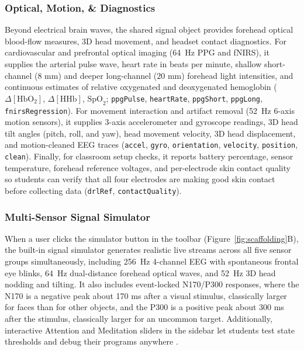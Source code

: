 \documentclass[11pt]{article}
\begin{document}
\subsubsection{Optical, Motion, \& Diagnostics}
Beyond electrical brain waves, the shared signal object provides forehead optical blood-flow measures, 3D head movement, and headset contact diagnostics. For cardiovascular and prefrontal optical imaging (64~Hz PPG and fNIRS), it supplies the arterial pulse wave, heart rate in beats per minute, shallow short-channel ($8\text{ mm}$) and deeper long-channel ($20\text{ mm}$) forehead light intensities, and continuous estimates of relative oxygenated and deoxygenated hemoglobin ($\Delta[\text{HbO}_2]$, $\Delta[\text{HHb}]$, $\text{SpO}_2$; \texttt{ppgPulse}, \texttt{heartRate}, \texttt{ppgShort}, \texttt{ppgLong}, \texttt{fnirsRegression}). For movement interaction and artifact removal (52~Hz 6-axis motion sensors), it supplies 3-axis accelerometer and gyroscope readings, 3D head tilt angles (pitch, roll, and yaw), head movement velocity, 3D head displacement, and motion-cleaned EEG traces (\texttt{accel}, \texttt{gyro}, \texttt{orientation}, \texttt{velocity}, \texttt{position}, \texttt{clean}). Finally, for classroom setup checks, it reports battery percentage, sensor temperature, forehead reference voltages, and per-electrode skin contact quality so students can verify that all four electrodes are making good skin contact before collecting data (\texttt{drlRef}, \texttt{contactQuality}).

\subsubsection{Multi-Sensor Signal Simulator}
When a user clicks the simulator button in the toolbar (Figure~\ref{fig:scaffolding}B), the built-in signal simulator generates realistic live streams across all five sensor groups simultaneously, including 256~Hz 4-channel EEG with spontaneous frontal eye blinks, 64~Hz dual-distance forehead optical waves, and 52~Hz 3D head nodding and tilting. It also includes event-locked N170/P300 responses, where the N170 is a negative peak about 170 ms after a visual stimulus, classically larger for faces than for other objects, and the P300 is a positive peak about 300 ms after the stimulus, classically larger for an uncommon target. Additionally, interactive Attention and Meditation sliders in the sidebar let students test state thresholds and debug their programs anywhere \citep{deleeuw2023simulating}.
\end{document}
